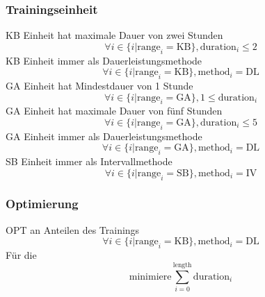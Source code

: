     \subsubsection{Trainingseinheit}
    KB Einheit hat maximale Dauer von zwei Stunden
        \begin{equation}
            \forall i \in \{i | \text{range}_i = \text{KB}\}, \text{duration}_i \leq 2
        \end{equation}
    KB Einheit immer als Dauerleistungsmethode
        \begin{equation}
            \forall i \in \{i | \text{range}_i = \text{KB}\}, \text{method}_i = \text{DL}
        \end{equation}
    GA Einheit hat Mindestdauer von 1 Stunde
        \begin{equation}
            \forall i \in \{i | \text{range}_i = \text{GA}\}, 1 \leq \text{duration}_i
        \end{equation}
    GA Einheit hat maximale Dauer von fünf Stunden
        \begin{equation}
            \forall i \in \{i | \text{range}_i = \text{GA}\}, \text{duration}_i \leq 5
        \end{equation}
    GA Einheit immer als Dauerleistungsmethode
        \begin{equation}
            \forall i \in \{i | \text{range}_i = \text{GA}\}, \text{method}_i = \text{DL}
        \end{equation}
    SB Einheit immer als Intervallmethode
        \begin{equation}
            \forall i \in \{i | \text{range}_i = \text{SB}\}, \text{method}_i = \text{IV}
        \end{equation}
        
    \subsubsection{Optimierung}
    OPT an Anteilen des Trainings 
        \begin{equation}
            \forall i \in \{i | \text{range}_i = \text{KB}\}, \text{method}_i = \text{DL}
        \end{equation}
        Für die 
        \begin{equation}
            \text{minimiere} \sum_{i=0}^{\text{length}} \text{duration}_i
        \end{equation}